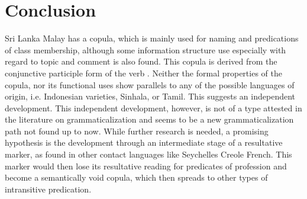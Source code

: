 \documentclass[a4paper,12pt]{article}
\begin{document}
\section{Conclusion}
Sri Lanka Malay has a copula, which is mainly used for naming and predications of class membership, although some information structure use especially with regard to topic and comment is also found. This copula is derived from the conjunctive participle form of the verb . Neither the formal properties of the copula, nor its functional uses show parallels to any of the possible languages of origin, i.e. Indonesian varieties, Sinhala, or Tamil. This suggests an independent development. This independent development, however, is not of a type attested in the literature on grammaticalization and seems to be a new grammaticalization path not found up to now. While further research is needed, a promising hypothesis is the development through an intermediate stage of a resultative marker, as found in other contact languages like Seychelles Creole French. This marker would then lose its resultative reading for predicates of profession and become a semantically void copula, which then spreads to other types of intransitive predication.
 



\end{document}
